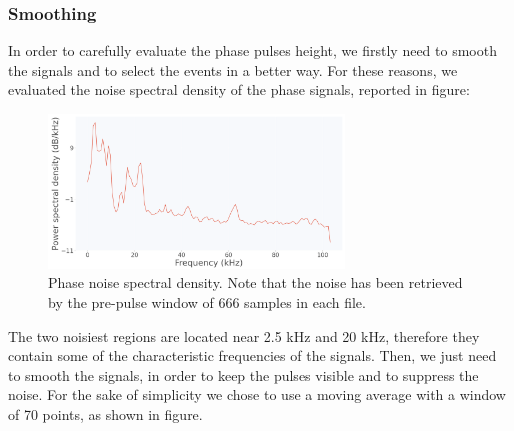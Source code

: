 \documentclass[12pt]{article}
\begin{document}
\subsubsection{Smoothing}
In order to carefully evaluate the phase pulses height, we firstly need to smooth the signals and to select the events in a better way. For these reasons, we evaluated the noise spectral density of the phase signals, reported in figure:
\begin{figure}[H]
\centering
\includegraphics[width=0.7\textwidth]{spectral density.png}
\caption{Phase noise spectral density. Note that the noise has been retrieved by the pre-pulse window of 666 samples in each file.}
\end{figure}
The two noisiest regions are located near 2.5 kHz and 20 kHz, therefore they contain some of the characteristic frequencies of the signals. Then, we just need to smooth the signals, in order to keep the pulses visible and to suppress the noise. For the sake of simplicity we chose to use a moving average with a window of 70 points, as shown in figure. 
\end{document}
